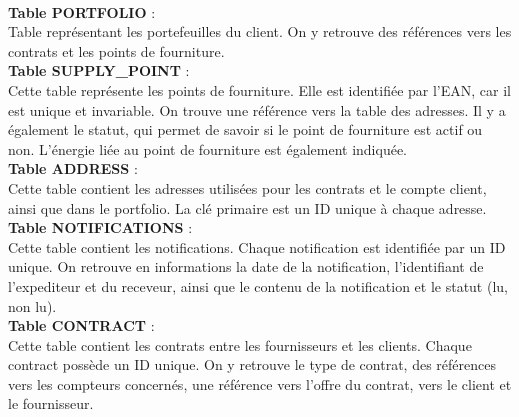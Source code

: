 \documentclass[../rapport.tex]{subfiles}
\begin{document}
\\
\textbf{Table PORTFOLIO} : \\ Table représentant les portefeuilles du client. On y retrouve des références vers les contrats et les points de fourniture. 
\\
\textbf{Table SUPPLY{\_}POINT} : \\ Cette table représente les points de fourniture. Elle est identifiée par l'EAN, car il est unique et invariable. On trouve une référence vers la table des adresses. Il y a également le statut, qui permet de savoir si le point de fourniture est actif ou non. L'énergie liée au point de fourniture est également indiquée.
\\
\textbf{Table ADDRESS} : \\ Cette table contient les adresses utilisées pour les contrats et le compte client, ainsi que dans le portfolio. La clé primaire est un ID unique à chaque adresse.
\\
\textbf{Table NOTIFICATIONS} :\\ Cette table contient les notifications. Chaque notification est identifiée par un ID unique. On retrouve en informations la date de la notification, l'identifiant de l'expediteur et du receveur, ainsi que le contenu de la notification et le statut (lu, non lu).
\\
\textbf{Table CONTRACT} : \\ Cette table contient les contrats entre les fournisseurs et les clients. Chaque contract possède un ID unique. On y retrouve le type de contrat, des références vers les compteurs concernés, une référence vers l'offre du contrat, vers le client et le fournisseur. 
\end{document}
